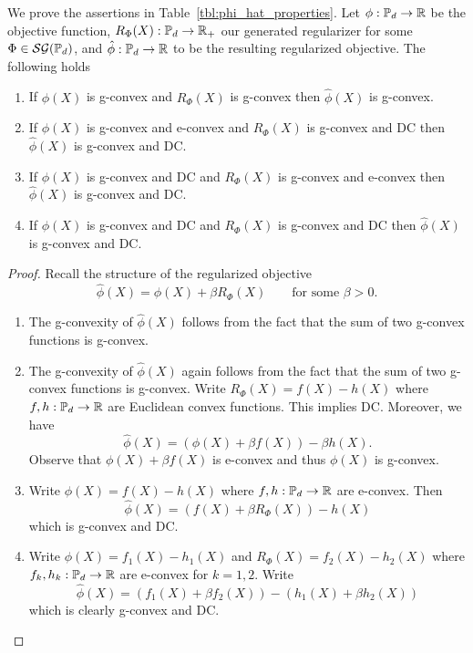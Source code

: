\documentclass[sn-nature]{sn-jnl}%
\theoremstyle{thmstyleone}%
\theoremstyle{thmstyletwo}%
\theoremstyle{thmstylethree}%
\begin{document}
\begin{prop}
    We prove the assertions in Table~\ref{tbl:phi_hat_properties}. Let $\phi: \mathbb{P}_d \to \mathbb{R}$ be the objective function, $R_\Phi(X):\mathbb{P}_d \to \mathbb{R}_+$ our generated regularizer for some $\Phi \in \mathcal{SG}(\mathbb{P}_d)$, and $\hat{\phi}:\mathbb{P}_d \to \mathbb{R}$ to be the resulting regularized objective. The following holds 
    \begin{enumerate}
        \item If $\phi(X)$ is g-convex and $R_\Phi(X)$ is g-convex then $\hat{\phi}(X)$ is g-convex.
        \item If $\phi(X)$ is g-convex and e-convex and $R_\Phi(X)$ is g-convex and DC then $\hat{\phi}(X)$ is g-convex and DC.
        \item If $\phi(X)$ is g-convex and DC and $R_\Phi(X)$ is g-convex and e-convex then $\hat{\phi}(X)$ is g-convex and DC.
        \item If $\phi(X)$ is g-convex and DC and $R_\Phi(X)$ is g-convex and DC then $\hat{\phi}(X)$ is g-convex and DC.
    \end{enumerate}
\end{prop}

\begin{proof}
Recall the structure of the regularized objective 
\[
\hat{\phi}(X) = \phi(X) + \beta R_\Phi(X) \qquad \text{for some } \beta > 0.
\]
\begin{enumerate}
    \item The g-convexity of $\hat{\phi}(X)$ follows from the fact that the sum of two g-convex functions is g-convex.
    \item The g-convexity of $\hat{\phi}(X)$ again follows from the fact that the sum of two g-convex functions is g-convex. Write $R_\Phi(X) = f(X) - h(X)$ where $f,h:\mathbb{P}_d \to \mathbb{R}$ are Euclidean convex functions. This implies DC. Moreover, we have
    \[
    \hat{\phi}(X) = \left(\phi(X) + \beta f(X)\right) - \beta h(X).
    \]
    Observe that $\phi(X) + \beta f(X)$ is e-convex and thus $\phi(X)$ is g-convex.
    \item Write $\phi(X) = f(X) - h(X)$ where $f,h:\mathbb{P}_d \to \mathbb{R}$ are e-convex. Then 
    \[
    \hat{\phi}(X) = \left( f(X) + \beta R_\Phi(X) \right) - h(X)
    \]
    which is g-convex and DC.
    \item Write $\phi(X) = f_1(X) - h_1(X)$ and $R_\Phi(X) = f_2(X) - h_2(X)$ where $f_k, h_k : \mathbb{P}_d \to \mathbb{R}$ are e-convex for $k = 1,2$. Write
    \[
    \hat{\phi}(X) = \left(f_1(X) + \beta f_2(X)\right) - \left(h_1(X) + \beta h_2(X)\right)
    \]
    which is clearly g-convex and DC.
\end{enumerate}
\end{proof}
\end{document}
